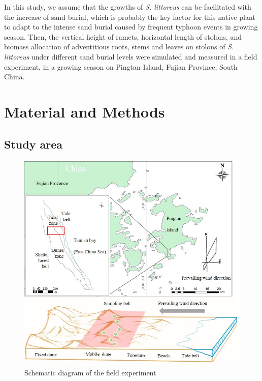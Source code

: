 \documentclass[]{interact}
\theoremstyle{plain}%
\theoremstyle{definition}
\theoremstyle{remark}
\begin{document}
\label{Introduction-5}
In this study, we assume that the growths of \textit{S. littoreus} can be facilitated with the increase of sand burial, which is probably the key factor for this native plant to adapt to the intense sand burial caused by frequent typhoon events in growing season. Then, the vertical height of ramets, horizontal length of stolons, and biomass allocation of adventitious roots, stems and leaves on stolons of \textit{S. littoreus} under different sand burial levels were simulated and measured in a field experiment, in a growing season on Pingtan Island, Fujian Province, South China.


\section{Material and Methods}
\subsection{Study area}

\begin{figure}
  \centering
  \includegraphics[scale=0.8]{../figs/study_area.jpg}
  \caption{Schematic diagram of the field experiment} 
  \label{fig:map}
\end{figure}
\end{document}
